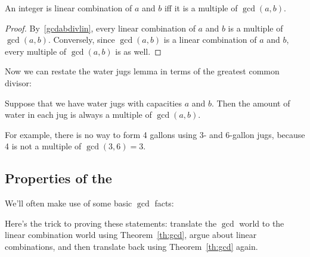 \begin{editingnotes}
\begin{corollary}\label{cor:lin-comb} An integer is linear combination of $a$ and $b$
iff it is a multiple of $\gcd(a, b)$.  \end{corollary}

\begin{proof} By~\eqref{gcdabdivlin}, every linear combination of $a$ and $b$ is a
multiple of $\gcd(a, b)$.  Conversely, since $\gcd(a, b)$ is a linear combination of $a$
and $b$, every multiple of $\gcd(a, b)$ is as well.  \end{proof}

Now we can restate the water jugs lemma in terms of the greatest common
divisor: \begin{corollary} \label{cor:waterjugs} Suppose that we have water jugs with
capacities $a$ and $b$.  Then the amount of water in each jug is always a multiple of
$\gcd(a, b)$.  \end{corollary}

For example, there is no way to form 4 gallons using 3- and 6-gallon jugs, because 4 is
not a multiple of $\gcd(3, 6) = 3$.

\subsection{Properties of the }

We'll often make use of some basic $\gcd$ facts:


Here's the trick to proving these statements: translate the $\gcd$ world to the linear
combination world using Theorem~\ref{th:gcd}, argue about linear combinations, and then
translate back using Theorem~\ref{th:gcd} again.


\end{editingnotes}
